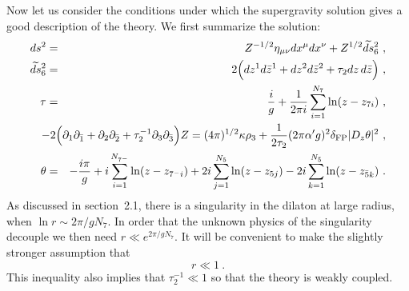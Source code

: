\documentclass[a4paper,12pt]{article}
\renewcommand{\=}[1]{\bar{#1}}
\begin{document}
Now let us consider the conditions under which the supergravity solution
gives a good description of the theory.  We first summarize the solution:
\begin{eqnarray}
ds^{2} &=& Z^{-1/2}\eta_{\mu\nu}dx^{\mu}dx^{\nu}+ Z^{1/2}
\widetilde{ds}{}_6^2\ ,\nonumber\\
\widetilde{ds}{}_6^{2} &=& 2\Bigl(
dz^{1}d\bar{z}^{1}+ dz^{2}d\bar{z}^{2}+ \tau_2
dz \,d\bar{z} \Bigr)\ , \nonumber\\
\tau &=& \frac{i}{g} +
\frac{1}{2\pi i} \sum_{i = 1}^{N_7} \ln(z - z_{7i})\ ,\nonumber\\
&&\hspace{-50pt}
- 2\Bigl( \partial_1
\partial_{\bar{1}}+ \partial_2 \partial_{\bar{2}}+ \tau_2^{-1}
\partial_3 \partial_{\bar{3}} \Bigr) Z =
(4\pi)^{1/2} \kappa \rho_3
+ \frac{1}{2\tau_2} (2\pi\alpha'g)^2
\delta_{\rm FP} |D_z \theta|^2 \ ,
\nonumber\\
\theta &=& -\frac{i\pi}{g} +
i \sum_{i = 1}^{N_{7^-}} 
  \ln(z - z_{7^-i}) + 2i  \sum_{j = 1}^{N_5} \ln(z - z_{5j})
-2i  \sum_{k = 1}^{N_{\bar 5}} \ln(z - z_{\bar 5k})
\ .
\end{eqnarray}
As discussed in section~2.1, there is a
singularity in the dilaton at large radius, when $\ln r \sim 2\pi / g N_7$.
In order that the unknown physics of the singularity decouple we then need
$r \ll e^{2\pi/g N_7}$.  It will be convenient to make the slightly stronger
assumption that
\begin{equation}
r \ll 1 \ .
\end{equation}
This inequality also implies that $\tau_2^{-1} \ll 1$ so that the theory is weakly
coupled.  
\end{document}
